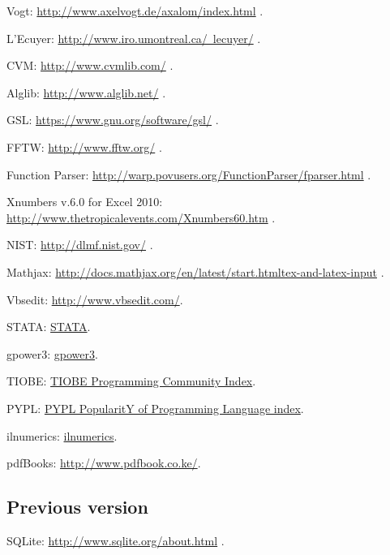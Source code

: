 	Vogt: \href{http://www.axelvogt.de/axalom/index.html}{http://www.axelvogt.de/axalom/index.html} .
	
	L'Ecuyer: \href{http://www.iro.umontreal.ca/~lecuyer/}{http://www.iro.umontreal.ca/~lecuyer/} .
	
	CVM: \href{http://www.cvmlib.com/}{http://www.cvmlib.com/} .
	
	Alglib: \href{http://www.alglib.net/}{http://www.alglib.net/} .
	
	GSL: \href{https://www.gnu.org/software/gsl/}{https://www.gnu.org/software/gsl/} .
	
	FFTW: \href{http://www.fftw.org/}{http://www.fftw.org/} .
	
	Function Parser: \href{http://warp.povusers.org/FunctionParser/fparser.html}{http://warp.povusers.org/FunctionParser/fparser.html} .
	
	
	Xnumbers v.6.0 for Excel 2010:  \href{http://www.thetropicalevents.com/Xnumbers60.htm}{http://www.thetropicalevents.com/Xnumbers60.htm} .
	
	
	NIST: \href{http://dlmf.nist.gov/}{http://dlmf.nist.gov/} .
	
	Mathjax: \href{http://docs.mathjax.org/en/latest/start.html#tex-and-latex-input}{http://docs.mathjax.org/en/latest/start.htmltex-and-latex-input} .
	
	Vbsedit: \href{http://www.vbsedit.com/}{http://www.vbsedit.com/}.
	
	STATA: \href{http://www.stata.com/}{STATA}.
	
	gpower3: \href{http://www.psycho.uni-duesseldorf.de/abteilungen/aap/gpower3/download-and-register}{gpower3}.
	
	TIOBE: \href{http://www.tiobe.com/index.php/content/paperinfo/tpci/index.html}{TIOBE Programming Community Index}.
	
	PYPL: \href{https://sites.google.com/site/pydatalog/pypl/PyPL-PopularitY-of-Programming-Language}{PYPL PopularitY of Programming Language index}.
	
	ilnumerics: \href{http://ilnumerics.net/index.html}{ilnumerics}.
	
	pdfBooks: \href{http://www.pdfbook.co.ke/}{http://www.pdfbook.co.ke/}.
	
	
	
	
	\subsection{Previous version}
	
	SQLite: \href{http://www.sqlite.org/about.html}{http://www.sqlite.org/about.html} .
	
